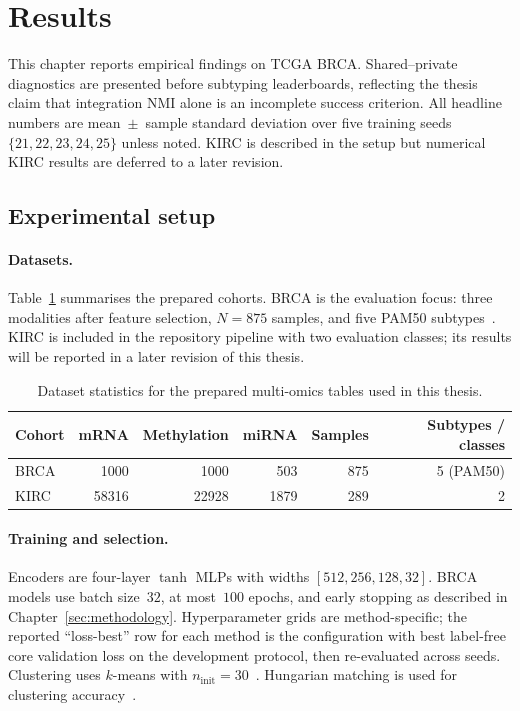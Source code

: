 \clearpage
\section{Results}
\label{sec:results}

This chapter reports empirical findings on TCGA BRCA. Shared--private diagnostics are presented before subtyping leaderboards, reflecting the thesis claim that integration NMI alone is an incomplete success criterion. All headline numbers are mean~$\pm$~sample standard deviation over five training seeds $\{21,22,23,24,25\}$ unless noted. KIRC is described in the setup but numerical KIRC results are deferred to a later revision.

\subsection{Experimental setup}

\paragraph{Datasets.}
Table~\ref{tab:datasets} summarises the prepared cohorts. BRCA is the evaluation focus: three modalities after feature selection, $N=875$ samples, and five PAM50 subtypes~\citep{parker2009pam50}. KIRC is included in the repository pipeline with two evaluation classes; its results will be reported in a later revision of this thesis.

\begin{table}[htbp]
\centering
\caption{Dataset statistics for the prepared multi-omics tables used in this thesis.}
\label{tab:datasets}
\begin{tabular}{lrrrrr}
\hline
Cohort & mRNA & Methylation & miRNA & Samples & Subtypes / classes \\
\hline
BRCA & 1000 & 1000 & 503 & 875 & 5 (PAM50) \\
KIRC & 58316 & 22928 & 1879 & 289 & 2 \\
\hline
\end{tabular}
\end{table}

\paragraph{Training and selection.}
Encoders are four-layer $\tanh$ MLPs with widths $[512,256,128,32]$. BRCA models use batch size~$32$, at most~$100$ epochs, and early stopping as described in Chapter~\ref{sec:methodology}. Hyperparameter grids are method-specific; the reported ``loss-best'' row for each method is the configuration with best label-free core validation loss on the development protocol, then re-evaluated across seeds. Clustering uses $k$-means with $n_{\mathrm{init}}=30$~\citep{lloyd1982least}. Hungarian matching is used for clustering accuracy~\citep{Kuhn1955Hungarian}.


